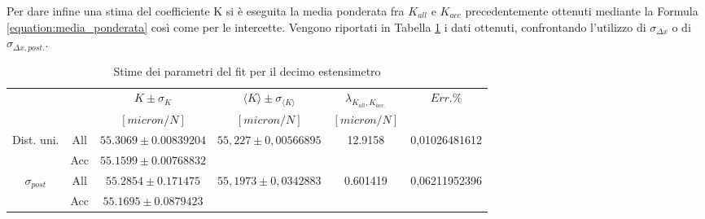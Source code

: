 \documentclass[a4paper,11pt,oneside]{article}
\begin{document}
Per dare infine una stima del coefficiente K si è eseguita la media ponderata fra $K_{all}$ e $K_{acc}$ precedentemente ottenuti mediante la Formula \ref{equation:media_ponderata} così come per le intercette. Vengono riportati in Tabella \ref{tab:parametri_fit_1ac} i dati ottenuti, confrontando l'utilizzo di $\sigma_{\Delta x}$ o di $\sigma_{\Delta x, post.}$.

\begin{table}[h!]
    \centering
    \begin{tabular}{|cc|c|c|c|c|}
        \hline
        &&$K \pm \sigma_{K}$&	$\langle K \rangle \pm \sigma_{\langle K \rangle}$&	$\lambda_{K_{all}, K_{acc.}}$&	$Err.\%$ \\
        &&$[micron/N]$&$[micron/N]$&$[micron/N]$&\\ \hline
        \multicolumn{1}{|c|}{\multirow{2}{*}{Dist. uni.}}
        &All&	$55.3069 \pm 0.00839204$&
        \multirow{2}{*}{$55,227\pm0,00566895$}&
        \multirow{2}{*}{12.9158}&
        \multirow{2}{*}{0,01026481612}\\    \cline{2-3}
        \multicolumn{1}{|c|}{}& Acc&	$55.1599 \pm 0.00768832$ & & &\\  
        \hline
        \multicolumn{1}{|c|}{\multirow{2}{*}{$\sigma_{post}$}}
        &All&	$55.2854 \pm 0.171475$&
        \multirow{2}{*}{$55,1973\pm0,0342883$}&
        \multirow{2}{*}{0.601419}&
        \multirow{2}{*}{0,06211952396}\\    \cline{2-3} 
        \multicolumn{1}{|c|}{}& Acc&	$55.1695\pm0.0879423$ & & &\\  \hline
    \end{tabular}
    \caption{Stime dei parametri del fit per il decimo estensimetro}
    \label{tab:parametri_fit_1ac}
\end{table}
\end{document}
